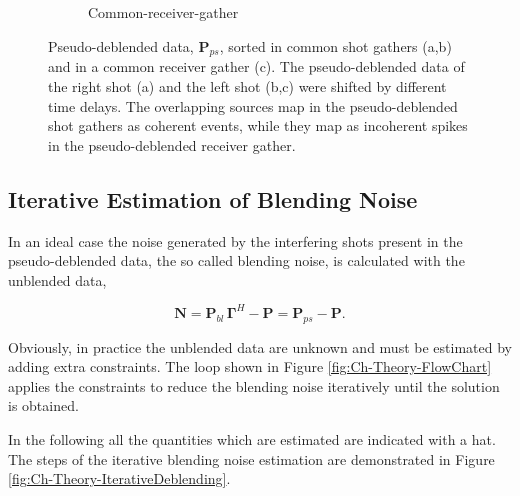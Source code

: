 \begin{figure}
\begin{subfigure}[t]{0.25\textwidth}
		\caption{Common-receiver-gather}
		\label{fig:Ch-Theory-PseudoDeblendedCRG}
	\end{subfigure}
	\caption{Pseudo-deblended data, $\mathbf{P}_{ps}$, sorted in common shot gathers (a,b) and in a common receiver gather (c). The pseudo-deblended data of the right shot (a) and the left shot (b,c) were shifted by different time delays. The overlapping sources map in the pseudo-deblended shot gathers as coherent events, while they map as incoherent spikes in the pseudo-deblended receiver gather.}
	\label{fig:Ch-Theory-PseudoDeblended}

\end{figure}


\subsection{Iterative Estimation of Blending Noise} \label{sec:IterBlenNoiseEst}

In an ideal case the noise generated by the interfering shots present in the pseudo-deblended data, the so called blending noise, is calculated with the unblended data,

\begin{equation}
	\mathbf{N} = \mathbf{P}_{bl} \, \mathbf{\Gamma}^H - \mathbf{P} = \mathbf{P}_{ps} - \mathbf{P}.
	\label{eq:Ch-Theory-Noise}
\end{equation}

Obviously, in practice the unblended data are unknown and must be estimated by adding extra constraints. The loop shown in Figure \ref{fig:Ch-Theory-FlowChart} applies the constraints to reduce the blending noise iteratively until the solution is obtained. 

In the following all the quantities which are estimated are indicated with a hat. The steps of the iterative blending noise estimation are demonstrated in Figure \ref{fig:Ch-Theory-IterativeDeblending}.

